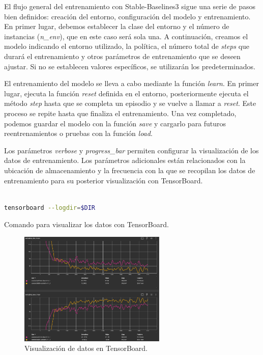 El flujo general del entrenamiento con Stable-Baselines3 sigue una serie de pasos bien definidos: creación del entorno, configuración del modelo y entrenamiento. En primer lugar, debemos establecer la clase del entorno y el número de instancias (\textit{n\_env}), que en este caso será sola una. A continuación, creamos el modelo indicando el entorno utilizado, la política, el número total de \textit{steps} que durará el entrenamiento y otros parámetros de entrenamiento que se deseen ajustar. Si no se establecen valores específicos, se utilizarán los predeterminados.

El entrenamiento del modelo se lleva a cabo mediante la función \textit{learn}. En primer lugar, ejecuta la función \textit{reset} definida en el entorno, posteriormente ejecuta el método \textit{step} hasta que se completa un episodio y se vuelve a llamar a \textit{reset}. Este proceso se repite hasta que finaliza el entrenamiento. Una vez completado, podemos guardar el modelo con la función \textit{save} y cargarlo para futuros reentrenamientos o pruebas con la función \textit{load}.

Los parámetros \textit{verbose} y \textit{progress\_bar} permiten configurar la visualización de los datos de entrenamiento. Los parámetros adicionales están relacionados con la ubicación de almacenamiento y la frecuencia con la que se recopilan los datos de entrenamiento para su posterior visualización con TensorBoard.

\begin{code}[h]
\begin{lstlisting}[language=bash]

tensorboard --logdir=$DIR

\end{lstlisting}
\caption[Comando para visualizar los datos en TensorBoard]{Comando para visualizar los datos con TensorBoard.}
\label{cod:cmdtsb}
\end{code}

\begin{figure}[ht]
  \begin{center}
    \includegraphics[width=7cm]{figs/Plataformas_Desarollo/TensorBoard.png}
  \end{center}
  \caption{Visualización de datos en TensorBoard.}
  \label{tensorboard}
\end{figure}

